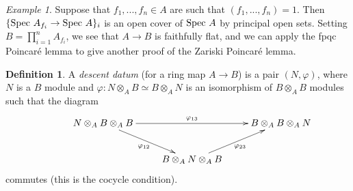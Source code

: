 \documentclass[letterpaper,11pt]{article}
\theoremstyle{definition}
\newtheorem{defn}{Definition}
\theoremstyle{remark}
\newtheorem{ex}{Example}
\begin{document}
\begin{ex} Suppose that $f_1, ..., f_n \in A$ are such that $(f_1, ..., f_n) = 1$. Then $\{\mbox{\rm Spec }A_{f_i} \rightarrow \mbox{\rm Spec }A\}_i$ is an open cover of $\mbox{\rm Spec }A$ by principal open sets. Setting $B = \prod_{i=1}^n A_{f_i}$, we see that $A \rightarrow B$ is faithfully flat, and we can apply the fpqc Poincar\'{e} lemma to give another proof of the Zariski Poincar\'{e} lemma.
\end{ex}

\begin{defn} A \emph{descent datum} (for a ring map $A \rightarrow B$) is a pair $(N,\varphi)$, where $N$ is a $B$ module and $\varphi: N \otimes_A B \simeq B\otimes_A N$ is an isomorphism of $B\otimes_A B$ modules such that the diagram
\begin{align*}
\xymatrix{&N\otimes_AB\otimes_AB \ar[rr]^{\varphi_{13}} \ar[dr]_{\varphi_{12}} & &B\otimes_AB\otimes_AN\\
& &B\otimes_AN\otimes_AB \ar[ur]_{\varphi_{23}}}
\end{align*}
commutes (this is the cocycle condition).
\end{defn}
\end{document}
